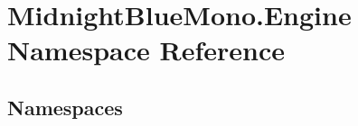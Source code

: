 \hypertarget{namespace_midnight_blue_mono_1_1_engine}{}\section{Midnight\+Blue\+Mono.\+Engine Namespace Reference}
\label{namespace_midnight_blue_mono_1_1_engine}
\subsection*{Namespaces}
\begin{DoxyCompactItemize}
\end{DoxyCompactItemize}

